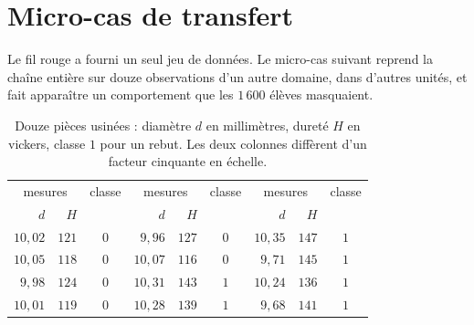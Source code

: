 \section{Micro-cas de transfert}
\label{sec:transfert}

Le fil rouge a fourni un seul jeu de données. Le micro-cas suivant reprend la
chaîne entière sur douze observations d'un autre domaine, dans d'autres unités,
et fait apparaître un comportement que les $1\,600$ élèves masquaient.

\begin{table}[htbp]
\centering
\small
\setlength{\tabcolsep}{5pt}
\begin{tabular}{rrc rrc rrc}
\toprule
\multicolumn{2}{c}{mesures} & classe &
\multicolumn{2}{c}{mesures} & classe &
\multicolumn{2}{c}{mesures} & classe \\
$d$ & $H$ & & $d$ & $H$ & & $d$ & $H$ & \\
\midrule
$10{,}02$ & $121$ & $0$ & $9{,}96$  & $127$ & $0$ & $10{,}35$ & $147$ & $1$ \\
$10{,}05$ & $118$ & $0$ & $10{,}07$ & $116$ & $0$ & $9{,}71$  & $145$ & $1$ \\
$9{,}98$  & $124$ & $0$ & $10{,}31$ & $143$ & $1$ & $10{,}24$ & $136$ & $1$ \\
$10{,}01$ & $119$ & $0$ & $10{,}28$ & $139$ & $1$ & $9{,}68$  & $141$ & $1$ \\
\bottomrule
\end{tabular}
\caption{Douze pièces usinées : diamètre $d$ en millimètres, dureté $H$ en
vickers, classe $1$ pour un rebut. Les deux colonnes diffèrent d'un facteur
cinquante en échelle.}
\label{tab:micro}
\end{table}

